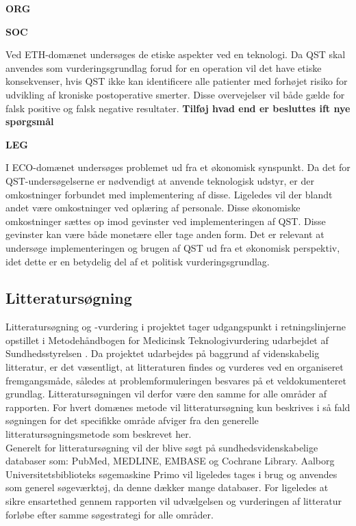 \textbf{ORG}


\textbf{SOC}


Ved ETH-domænet undersøges de etiske aspekter ved en teknologi. Da QST skal anvendes som vurderingsgrundlag forud for en operation vil det have etiske konsekvenser, hvis QST ikke kan identificere alle patienter med forhøjet risiko for udvikling af kroniske postoperative smerter. Disse overvejelser vil både gælde for falsk positive og falsk negative resultater. \textbf{Tilføj hvad end er besluttes ift nye spørgsmål}       


\textbf{LEG}


I ECO-domænet undersøges problemet ud fra et økonomisk synspunkt. Da det for QST-undersøgelserne er nødvendigt at anvende teknologisk udstyr, er der omkostninger forbundet med implementering af disse. Ligeledes vil der blandt andet være omkostninger ved oplæring af personale. Disse økonomiske omkostninger sættes op imod gevinster ved implementeringen af QST. Disse gevinster kan være både monetære eller tage anden form. Det er relevant at undersøge implementeringen og brugen af QST ud fra et økonomisk perspektiv, idet dette er en betydelig del af et politisk vurderingsgrundlag. 


\subsection{Litteratursøgning}
Litteratursøgning og -vurdering i projektet tager udgangspunkt i retningslinjerne opstillet i Metodehåndbogen for Medicinsk Teknologivurdering udarbejdet af Sundhedsstyrelsen \citep{metodehaandbogen}. Da projektet udarbejdes på baggrund af videnskabelig litteratur, er det væsentligt, at litteraturen findes og vurderes ved en organiseret fremgangsmåde, således at problemformuleringen besvares på et veldokumenteret grundlag. Litteratursøgningen vil derfor være den samme for alle områder af rapporten. For hvert domænes metode vil litteratursøgning kun beskrives i så fald søgningen for det specifikke område afviger fra den generelle litteratursøgningsmetode som beskrevet her. \\
Generelt for litteratursøgning vil der blive søgt på sundhedsvidenskabelige databaser som: PubMed, MEDLINE, EMBASE og Cochrane Library. Aalborg Universitetsbiblioteks søgemaskine Primo vil ligeledes tages i brug og anvendes som generel søgeværktøj, da denne dækker mange databaser. For ligeledes at sikre ensartethed gennem rapporten vil udvælgelsen og vurderingen af litteratur forløbe efter samme søgestrategi for alle områder. 


